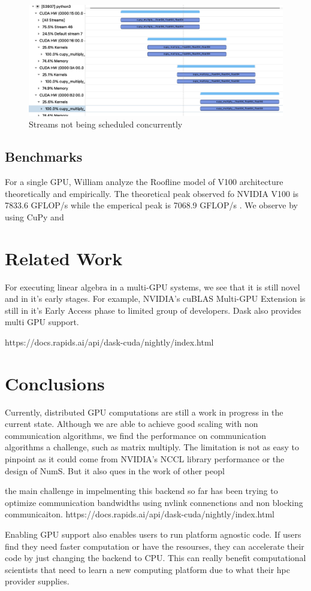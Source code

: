 \documentclass{article}
\begin{document}
\begin{figure}
  \centerline{\includegraphics[width=6in]{figures/stream.png}}
  \caption{Streams not being scheduled concurrently}
\end{figure}

\subsection{Benchmarks}
For a single GPU, William analyze the Roofline model of V100 architecture theoretically and empirically. The theoretical peak observed fo NVIDIA V100 is 7833.6 GFLOP/s while the emperical peak is 7068.9 GFLOP/s \cite{roofline}. We observe by using CuPy and 
 
\section{Related Work}
For executing linear algebra in a multi-GPU systems, we see that it is still novel and in it's early stages. For example, NVIDIA's cuBLAS Multi-GPU Extension is still in it's Early Access phase to limited group of developers. \cite{cublasmg} Dask also provides multi GPU support.

https://docs.rapids.ai/api/dask-cuda/nightly/index.html

\section{Conclusions}
Currently, distributed GPU computations are still a work in progress in the current state. Although we are able to achieve good scaling with non communication algorithms, we find the performance on communication algorithms a challenge, such as matrix multiply. The limitation is not as easy to pinpoint as it could come from NVIDIA's NCCL library performance or the design of NumS. But it also ques in the work of other peopl



the main challenge in impelmenting this backend so far has been trying to optimize communication bandwidths using nvlink connenctions and non blocking communicaiton. 
https://docs.rapids.ai/api/dask-cuda/nightly/index.html

Enabling GPU support also enables users to run platform agnostic code. If users find they need faster computation or have the resourses, they can accelerate their code by just changing the backend to CPU. This can really benefit computational scientists that need to learn a new computing platform due to what their hpc provider supplies. 


 
\end{document}
